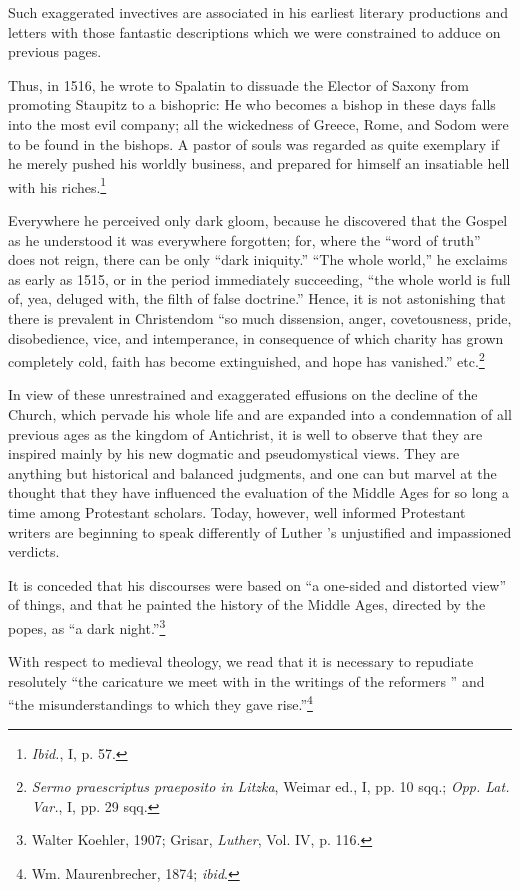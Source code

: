 Such exaggerated invectives are associated in his earliest literary productions
and letters with those fantastic descriptions which we were constrained
to adduce on previous pages.

Thus, in 1516, he wrote to Spalatin to dissuade the Elector of Saxony
from promoting Staupitz to a bishopric: He who becomes a bishop in these
days falls into the most evil company; all the wickedness of Greece, Rome,
and Sodom were to be found in the bishops. A pastor of souls was regarded
as quite exemplary if he merely pushed his worldly business, and prepared
for himself an insatiable hell with his riches.\footnote{\textit{Ibid.}, I, p. 57.}

Everywhere he perceived only dark gloom, because he discovered that
the Gospel as he understood it was everywhere forgotten; for, where the
“word of truth” does not reign, there can be only “dark iniquity.” “The
whole world,” he exclaims as early as 1515, or in the period immediately
succeeding, “the whole world is full of, yea, deluged with, the filth of false
doctrine.” Hence, it is not astonishing that there is prevalent in Christendom
“so much dissension, anger, covetousness, pride, disobedience, vice, and
intemperance, in consequence of which charity has grown completely cold,
faith has become extinguished, and hope has vanished.” etc.\footnote
{\textit{Sermo praescriptus praeposito in Litzka}, Weimar ed., I, pp. 10 sqq.; \textit{Opp. Lat. Var.}, I,
pp. 29 sqq.}

In view of these unrestrained and exaggerated effusions on the
decline of the Church, which pervade his whole life and are expanded into
a condemnation of all previous ages as the kingdom
of Antichrist, it is well to observe that they are inspired mainly by
his new dogmatic and pseudomystical views. They are anything but
historical and balanced judgments, and one can but marvel at the
thought that they have influenced the evaluation of the Middle
Ages for so long a time among Protestant scholars. Today, however, well
informed Protestant writers are beginning to speak differently of Luther
’s unjustified and impassioned verdicts.

It is conceded that his discourses were based on “a one-sided and distorted
view” of things, and that he painted the history of the Middle Ages,
directed by the popes, as “a dark night.”\footnote
{Walter Koehler, 1907; Grisar, \textit{Luther}, Vol. IV, p. 116.}

With respect to medieval theology, we read that it is necessary to repudiate
resolutely “the caricature we meet with in the writings of the reformers
” and “the misunderstandings to which they gave rise.”\footnote
{Wm. Maurenbrecher, 1874; \textit{ibid}.}

